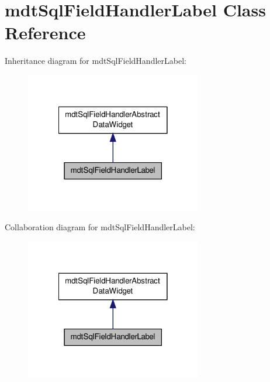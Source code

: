 \hypertarget{classmdt_sql_field_handler_label}{\section{mdt\-Sql\-Field\-Handler\-Label Class Reference}
\label{classmdt_sql_field_handler_label}
}


Inheritance diagram for mdt\-Sql\-Field\-Handler\-Label\-:\nopagebreak
\begin{figure}[H]
\begin{center}
\leavevmode
\includegraphics[width=218pt]{classmdt_sql_field_handler_label__inherit__graph}
\end{center}
\end{figure}


Collaboration diagram for mdt\-Sql\-Field\-Handler\-Label\-:\nopagebreak
\begin{figure}[H]
\begin{center}
\leavevmode
\includegraphics[width=218pt]{classmdt_sql_field_handler_label__coll__graph}
\end{center}
\end{figure}
